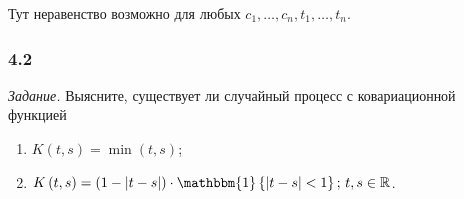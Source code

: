 Тут неравенство возможно для любых $c_1, \dotsc, c_n, t_1, \dotsc, t_n$.

\subsubsection*{4.2}

\textit{Задание.}
Выясните, существует ли случайный процесс с ковариационной функцией
\begin{enumerate}[label=\alph*)]
  \item $K \left( t, s \right) = \min \left( t, s \right) $;
  \item $K \left( t, s \right) =
    \left( 1 - \left| t - s \right| \right) \cdot
    \mathbbm{1} \left\{ \left| t - s \right| < 1 \right\}; \,
    t, s \in \mathbb{R}$.
\end{enumerate}

